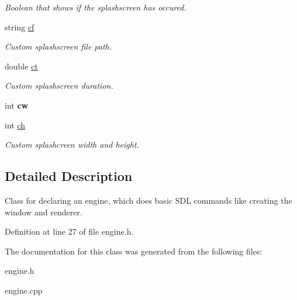 \begin{DoxyCompactItemize}
\begin{DoxyCompactList}\small\item\em Boolean that shows if the splashscreen has occured. \end{DoxyCompactList}\item 
string \hyperlink{classEngine_af5917b4f27bb16bf68b074b62c0e5587}{cf}\hypertarget{classEngine_af5917b4f27bb16bf68b074b62c0e5587}{}\label{classEngine_af5917b4f27bb16bf68b074b62c0e5587}

\begin{DoxyCompactList}\small\item\em Custom splashscreen file path. \end{DoxyCompactList}\item 
double \hyperlink{classEngine_a6e76eccd4f6e976a2068b9eb0acb4e85}{ct}\hypertarget{classEngine_a6e76eccd4f6e976a2068b9eb0acb4e85}{}\label{classEngine_a6e76eccd4f6e976a2068b9eb0acb4e85}

\begin{DoxyCompactList}\small\item\em Custom splashscreen duration. \end{DoxyCompactList}\item 
int {\bfseries cw}\hypertarget{classEngine_aff6e103dd58c2ea3b7798e7bc52db361}{}\label{classEngine_aff6e103dd58c2ea3b7798e7bc52db361}

\item 
int \hyperlink{classEngine_a2acd0bd074160e654d076376d36a3479}{ch}\hypertarget{classEngine_a2acd0bd074160e654d076376d36a3479}{}\label{classEngine_a2acd0bd074160e654d076376d36a3479}

\begin{DoxyCompactList}\small\item\em Custom splashcreen width and height. \end{DoxyCompactList}\end{DoxyCompactItemize}


\subsection{Detailed Description}
Class for declaring an engine, which does basic S\+DL commands like creating the window and renderer. 

Definition at line 27 of file engine.\+h.



The documentation for this class was generated from the following files\+:\begin{DoxyCompactItemize}
\item 
engine.\+h\item 
engine.\+cpp\end{DoxyCompactItemize}
